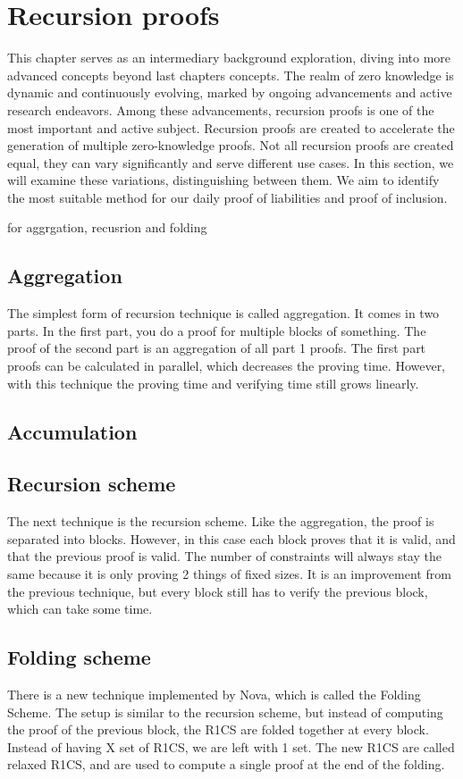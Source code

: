 
\chapter{Recursion proofs}

This chapter serves as an intermediary background exploration, 
diving into more advanced concepts beyond last chapters concepts. 
The realm of zero knowledge is dynamic and continuously evolving, 
marked by ongoing advancements and active research endeavors. Among these advancements, 
recursion proofs is one of the most important and active subject. Recursion proofs are created to accelerate
 the generation of multiple zero-knowledge proofs. 
 Not all recursion proofs are created equal, they can vary significantly and serve different use cases. 
 In this section, we will examine these variations, distinguishing between them. 
 We aim to identify the most suitable method for our daily proof of liabilities and proof of inclusion.


 \cite{Nova23} for aggrgation, recusrion and folding

 \section{Aggregation}
 The simplest form of recursion technique is called aggregation. 
 It comes in two parts. In the first part, you do a proof for multiple blocks of something. 
 The proof of the second part is an aggregation of all part 1 proofs. 
 The first part proofs can be calculated in parallel, which decreases the proving time. 
 However, with this technique the proving time and verifying time still grows linearly.

 \section{Accumulation}

 \section{Recursion scheme} 
The next technique is the recursion scheme. Like the aggregation, the proof is separated into blocks. However, in this case each block proves that it is valid, and that the previous proof is valid. The number of constraints will always stay the same because it is only proving 2 things of fixed sizes. It is an improvement from the previous technique, but every block still has to verify the previous block, which can take some time.

\section{Folding scheme} 
There is a new technique implemented by Nova, which is called the Folding Scheme. The setup is similar to the recursion scheme, but instead of computing the proof of the previous block, the R1CS are folded together at every block. Instead of having X set of R1CS, we are left with 1 set. The new R1CS are called relaxed R1CS, and are used to compute a single proof at the end of the folding.
